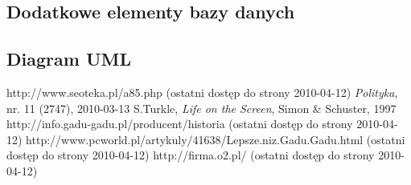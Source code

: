 \documentclass[a4paper,12pt]{article}
\begin{document}
\subsection[Dodatkowe elementy bazy danych]{Dodatkowe elementy bazy danych}

\subsection[Diagram UML]{Diagram UML}

\begin{thebibliography}{9}
 http://www.seoteka.pl/a85.php (ostatni dostęp do strony 2010-04-12)
 \emph{Polityka}, nr. 11 (2747), 2010-03-13
 S.Turkle, \emph{Life on the Screen}, Simon \& Schuster, 1997
 http://info.gadu-gadu.pl/producent/historia (ostatni dostęp do strony 2010-04-12)
 http://www.pcworld.pl/artykuly/41638/Lepsze.niz.Gadu.Gadu.html (ostatni dostęp do strony 2010-04-12)
 http://firma.o2.pl/ (ostatni dostęp do strony 2010-04-12)
\end{thebibliography}
\end{document}
